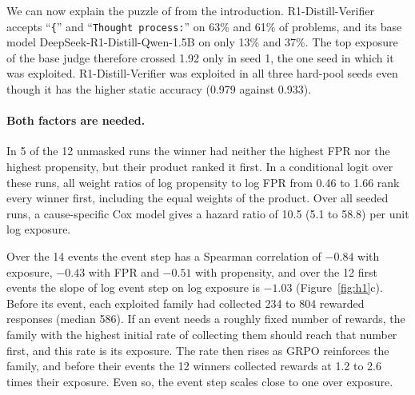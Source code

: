 \documentclass[11pt]{article}
\newcommand{\str}[1]{``\texttt{#1}''}
\begin{document}
We can now explain the puzzle of \citet{huang2025accuracy} from the introduction. R1-Distill-Verifier
accepts \str{\{} and \str{Thought process:} on 63\% and 61\% of problems, and its base model
DeepSeek-R1-Distill-Qwen-1.5B on only 13\% and 37\%. The top exposure of the base judge therefore crossed 1.92
only in seed 1, the one seed in which it was exploited. R1-Distill-Verifier was exploited in all three hard-pool
seeds even though it has the higher static accuracy (0.979 against 0.933).

\paragraph{Both factors are needed.} In 5 of the 12 unmasked runs the winner had
neither the highest FPR nor the highest propensity, but their product ranked it first. In a conditional
logit over these runs, all weight ratios of log propensity to log FPR from 0.46 to 1.66 rank every winner first,
including the equal weights of the product. Over all seeded runs, a cause-specific Cox model gives a hazard ratio of 10.5 (5.1 to 58.8) per unit log
exposure.

Over the 14 events the event step has a Spearman correlation of $-0.84$ with exposure, $-0.43$ with FPR and $-0.51$
with propensity, and over the 12 first events the slope of log event step on log exposure is $-1.03$
(Figure~\ref{fig:h1}c). Before its event, each exploited family had collected 234 to 804 rewarded responses (median
586). If an event needs a roughly fixed number of rewards, the family with the highest initial rate of collecting them should
reach that number first, and this rate is its exposure. The rate then rises as GRPO reinforces the family, and before
their events the 12 winners collected rewards at 1.2 to 2.6 times their exposure. Even so, the event step
scales close to one over exposure.
\end{document}
